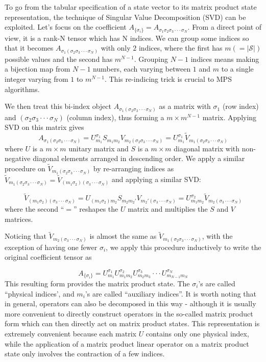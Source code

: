 \documentclass[english]{article}[12pt]
\begin{document}
To go from the tabular specification of a state vector to its matrix product state representation, the technique of Singular Value Decomposition (SVD) can be exploited. Let's focus on the coefficient $A_{\{\sigma_{i}\}}=A_{\sigma_{1}\sigma_{2}\sigma_{3}\cdot\cdot\cdot\sigma_{N}}$.
From a direct point of view, it is a rank-N tensor which has N indices.
We can group some indices so that it becomes $A_{\sigma_{1}(\sigma_{2}\sigma_{3}\cdot\cdot\cdot\sigma_{N})}$
with only $2$ indices, where the first has $m(=|\mathcal{S}|)$ possible values and
the second has $m^{N-1}$. Grouping $N-1$ indices means making a
bijection map from $N-1$ numbers, each varying between $1$ and $m$ to
a single integer varying from $1$ to $m^{N-1}$. This re-indicing
trick is crucial to MPS algorithms.

We then treat this bi-index object $A_{\sigma_{1}(\sigma_{2}\sigma_{3}\cdot\cdot\cdot\sigma_{N})}$
as a matrix with $\sigma_{1}$  (row index) and $(\sigma_{2}\sigma_{3}\cdot\cdot\cdot\sigma_{N})$
 (column index), thus forming a $m\times m^{N-1}$ matrix. Applying
SVD on this matrix gives 
\[
A_{\sigma_{1}(\sigma_{2}\sigma_{3}\cdot\cdot\cdot\sigma_{N})}=U_{m_{1}}^{\sigma_{1}}S_{m_{1}m_{2}}V_{m_{2}(\sigma_{2}\sigma_{3}\cdot\cdot\cdot\sigma_{N})}=U_{m_{1}}^{\sigma_{1}}\tilde{V}_{m_{1}(\sigma_{2}\sigma_{3}\cdot\cdot\cdot\sigma_{N})}
\]
where $U$ is a $m\times m$ unitary matrix and $S$ is a $m\times m$
diagonal matrix with non-negative diagonal elements arranged in descending
order. We apply a similar procedure on $\tilde{V}_{m_{1}(\sigma_{2}\sigma_{3}\cdot\cdot\cdot\sigma_{N})}$
by re-arranging indices as $\tilde{V}_{m_{1}(\sigma_{2}\sigma_{3}\cdot\cdot\cdot\sigma_{N})}=\tilde{V}_{(m_{1}\sigma_{2})(\sigma_{3}\cdot\cdot\cdot\sigma_{N})}$
and applying a similar SVD:

\[
\tilde{V}_{(m_{1}\sigma_{2})(\sigma_{3}\cdot\cdot\cdot\sigma_{N})}=U_{(m_{1}\sigma_{2})m_{2}}S_{m_{2}m_{2}'}V_{m_{2}'(\sigma_{3}\cdot\cdot\cdot\sigma_{N})}=U_{m_{1}m_{2}}^{\sigma_{2}}\tilde{V}_{m_{2}(\sigma_{3}\cdot\cdot\cdot\sigma_{N})}
\]
where the second ``$=$'' reshapes the $U$ matrix and multiplies
the $S$ and $V$ matrices. 

Noticing that $\tilde{V}_{m_{2}(\sigma_{3}\cdot\cdot\cdot\sigma_{N})}$
is almost the same as $\tilde{V}_{m_{1}(\sigma_{2}\sigma_{3}\cdot\cdot\cdot\sigma_{N})}$,
with the exception of having one fewer $\sigma_{i}$, we apply this procedure
inductively to write the original coefficient tensor as

\[
A_{\{\sigma_{i}\}}=U_{m_{1}}^{\sigma_{1}}U_{m_{1}m_{2}}^{\sigma_{2}}U_{m_{2}m_{3}}^{\sigma_{3}}\cdot\cdot\cdot U_{m_{N-1}m_{N}}^{\sigma_{N}}
\]
This resulting form  provides the matrix product state. The $\sigma_{i}$'s
are called ``physical indices', and $m_{i}$'s are called ``auxiliary
indices''. It is worth noting that in general, operators can also
be decomposed in this way - although it is usually more convenient
to directly construct operators in the so-called matrix product form which can then directly act on matrix product states. This representation
is extremely convenient because each matrix $U$ contains only one physical
index, while the application of a matrix product linear operator
on a matrix product state only involves the contraction of a few indices.
\end{document}
